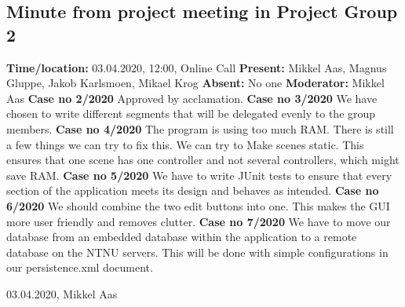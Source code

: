 \documentclass{article}
\begin{document}
\subsection{Minute from project meeting in Project Group 2}
\newline
\textbf{Time/location:} 03.04.2020, 12:00, Online Call
\newline
\textbf{Present: }Mikkel Aas, Magnus Gluppe, Jakob Karlsmoen, Mikael Krog
\newline
\textbf{Absent:} No one
\newline
\textbf{Moderator:} Mikkel Aas
\newline \newline
\textbf{Case no 2/2020} \newline
Approved by acclamation.
\newline  \newline
\textbf{Case no 3/2020}  \newline
We have chosen to write different segments that will be delegated evenly to the group members.
\newline  \newline
\textbf{Case no 4/2020}  \newline
The program is using too much RAM. There is still a few things we can try to fix this. We can try to Make scenes static. This ensures that one scene has one controller and not several controllers, which might save RAM.
\newline  \newline
\textbf{Case no 5/2020}  \newline
We have to write JUnit tests to ensure that every section of the application meets its design and behaves as intended.
\newline  \newline
\textbf{Case no 6/2020}  \newline
We should combine the two edit buttons into one. This makes the GUI more user friendly and removes clutter.
\newline  \newline
\textbf{Case no 7/2020}  \newline
We have to move our database from an embedded database within the application to a remote database on the NTNU servers. This will be done with simple configurations in our persistence.xml document.
\begin{flushright} 03.04.2020, Mikkel Aas\end{flushright}

\newpage
\end{document}
